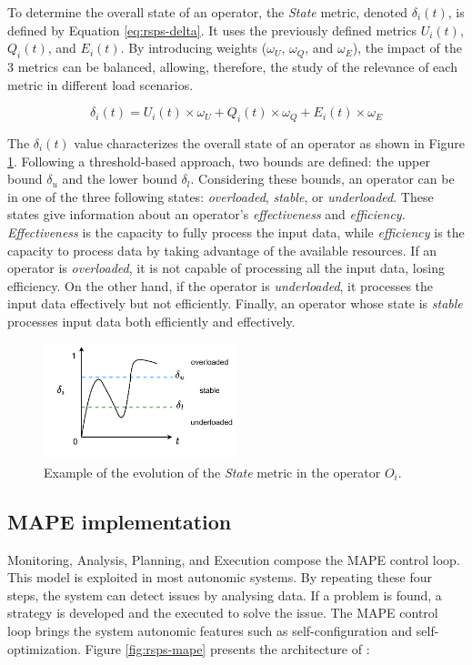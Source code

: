 To determine the overall state of an operator, the \textit{State} metric, denoted $\delta_i(t)$, is defined by Equation \ref{eq:rsps-delta}. It uses the previously defined metrics $U_i(t)$, $Q_i(t)$, and $E_i(t)$. By introducing weights ($\omega_U$, $\omega_Q$, and $\omega_E$), the impact of the 3 metrics can be balanced, allowing, therefore, the study of the relevance of each metric in different load scenarios.

\begin{equation}
    \delta_i(t) = U_i(t) \times \omega_U + Q_i(t) \times \omega_Q + E_i(t) \times \omega_E
    \label{eq:rsps-delta}
\end{equation}

The $\delta_i(t)$ value characterizes the overall state of an operator as shown in Figure \ref{fig:rsps-metric-state}. Following a threshold-based approach, two bounds are defined: the upper bound $\delta_{u}$ and the lower bound $\delta_{l}$. Considering these bounds, an operator can be in one of the three following states: \textit{overloaded}, \textit{stable}, or \textit{underloaded}. These states give information about an operator's \textit{effectiveness} and \textit{efficiency}. \textit{Effectiveness} is the capacity to fully process the input data, while \textit{efficiency} is the capacity to process data by taking advantage of the available resources. If an operator is \textit{overloaded}, it is not capable of processing all the input data, losing efficiency. On the other hand, if the operator is \textit{underloaded}, it processes the input data effectively but not efficiently. Finally, an operator whose state is \textit{stable} processes input data both efficiently and effectively.

\begin{figure}[!ht]
    \centering
    \includegraphics[width=0.5\textwidth]{figures/concepts/RA-SPS-Metric-Delta.pdf}
    \caption{Example of the evolution of the \textit{State} metric in the operator $O_i$.}
    \label{fig:rsps-metric-state}
\end{figure}

\subsection{MAPE implementation}
Monitoring, Analysis, Planning, and Execution compose the MAPE control loop. This model is exploited in most autonomic systems. By repeating these four steps, the system can detect issues by analysing data. If a problem is found, a strategy is developed and the executed to solve the issue. The MAPE control loop brings the system autonomic features such as self-configuration and self-optimization. Figure \ref{fig:rsps-mape} presents the
architecture of \rSPS{}:


